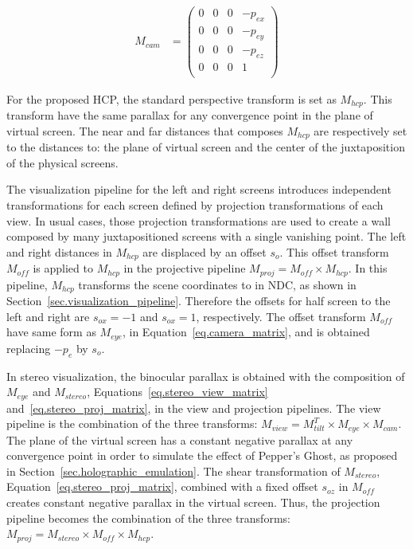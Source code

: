 \begin{equation}
\begin{aligned}
M_{cam} &= 
\begin{pmatrix} 
0      & 0      & 0      & -p_{ex}\\
0      & 0      & 0      & -p_{ey}\\
0      & 0      & 0      & -p_{ez}\\
0      & 0      & 0      & 1\\
\end{pmatrix}
\end{aligned}
\label{eq.camera_matrix}
\end{equation}

For the proposed HCP, the standard perspective transform is set as $M_{hcp}$. This transform have the same parallax for any convergence point in the plane of virtual screen. The near and far distances that composes $M_{hcp}$ are respectively set to the distances to: the plane of virtual screen and the center of the juxtaposition of the physical screens. 

The visualization pipeline for the left and right screens introduces independent transformations for each screen defined by projection transformations of each view. In usual cases, those projection transformations are used to create a wall composed by many juxtapositioned screens with a single vanishing point. The left and right distances in $M_{hcp}$ are displaced by an offset $s_o$. This offset transform $M_{off}$ is applied to $M_{hcp}$ in the projective pipeline $M_{proj} = M_{off} \times M_{hcp}$. In this pipeline,  $M_{hcp}$ transforms the scene coordinates to in NDC, as shown in Section~\ref{sec.visualization_pipeline}. Therefore the offsets for half screen to the left and right are $s_{ox} = -1$ and $s_{ox} = 1$, respectively. The offset transform $M_{off}$ have same form as $M_{eye}$, in Equation~\ref{eq.camera_matrix}, and is obtained replacing $-p_e$ by $s_o$.

In stereo visualization, the binocular parallax is obtained with the composition of $M_{eye}$ and $M_{stereo}$, Equations~\ref{eq.stereo_view_matrix} and~\ref{eq.stereo_proj_matrix}, in the view and projection pipelines. The view pipeline is the combination of the three transforms: $M_{view} = M_{tilt}^{T}   \times M_{eye} \times M_{cam}$. The plane of the virtual screen has a constant negative parallax at any convergence point in order to simulate the effect of Pepper's Ghost, as proposed in Section~\ref{sec.holographic_emulation}.  The shear transformation of $M_{stereo}$, Equation~\ref{eq.stereo_proj_matrix}, combined with a fixed offset $s_{oz}$ in $M_{off}$ creates constant negative parallax in the virtual screen. Thus, the projection pipeline becomes the combination of the three transforms: $M_{proj} = M_{stereo}  \times M_{off} \times M_{hcp}$. 

